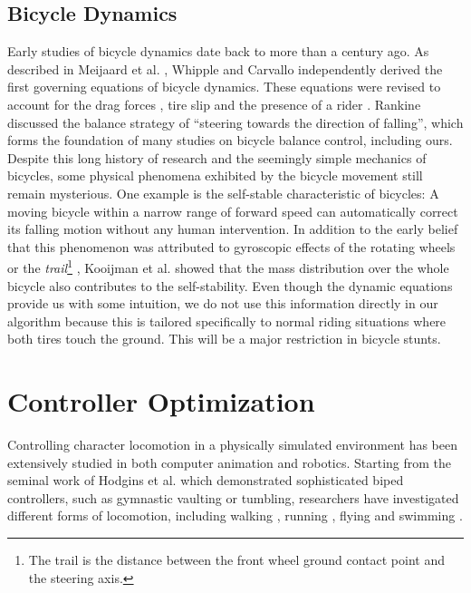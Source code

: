 \subsection{Bicycle Dynamics} Early studies of bicycle dynamics date back to more than a century ago. As described in Meijaard et al. \cite{Meijaard2007}, Whipple \cite{Whipple1899} and Carvallo \cite{Carvallo1900} independently derived the first governing equations of bicycle dynamics. These equations were revised to account for the drag forces \cite{Collins1963}, tire slip \cite{Singh1964} and the presence of a rider \cite{van1975method}. Rankine \cite{Rankine1870} discussed the balance strategy of ``steering towards the direction of falling'', which forms the foundation of many studies on bicycle balance control, including ours. Despite this long history of research and the seemingly simple mechanics of bicycles, some physical phenomena exhibited by the bicycle movement still remain mysterious. One example is the self-stable characteristic of bicycles: A moving bicycle within a narrow range of forward speed can automatically correct its falling motion without any human intervention. In addition to the early belief that this phenomenon was attributed to gyroscopic effects of the rotating wheels \cite{Klein1910} or the \emph{trail}\footnote{The trail is the distance between the front wheel ground contact point and the steering axis.} \cite{Jones1970}, Kooijman et al. \cite{Kooijman2011} showed that the mass distribution over the whole bicycle also contributes to the self-stability. Even though the dynamic equations provide us with some intuition, we do not use this information directly in our algorithm because this is tailored specifically to normal riding situations where both tires touch the ground. This will be a major restriction in bicycle stunts.

\section{Controller Optimization}

Controlling character locomotion in a physically simulated environment has been extensively studied in both computer animation and robotics. Starting from the seminal work of Hodgins et al. \cite{Hodgins:1995:AHA} which demonstrated sophisticated biped
controllers, such as gymnastic vaulting or tumbling, researchers have investigated different forms of locomotion, including walking \cite{Yin:2007,Wang:2012}, running \cite{Hodgins:1995:AHA,Kwon:2010}, flying \cite{Wu:2003} and swimming \cite{Grzeszczuk:1995}.

